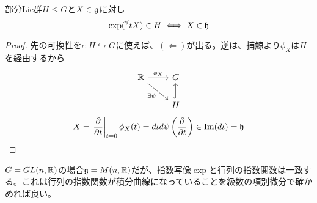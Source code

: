 \begin{prop}
    部分Lie群$H\leq G$と$X\in\mathfrak{g}$に対し
    \[\exp({}^\forall tX)\in H\iff X\in\mathfrak{h}\]
\end{prop}
\begin{proof}
    先の可換性を$\iota:H\hookrightarrow G$に使えば、$(\Leftarrow)$が出る。逆は、捕鯨より$\phi_X$は$H$を経由するから
    \[\begin{tikzcd}
        \R\arrow[r,"\phi_X"]\arrow[rd,"\exists\psi"'] & G\\
        & H\arrow[u,hook]
    \end{tikzcd}\]
    \[X=\left.\frac{\partial }{\partial t}\right\lvert_{t=0}\phi_X(t)=d\iota d\psi\left(\frac{\partial }{\partial t}\right)\in \mathrm{Im} (d\iota)=\mathfrak{h}\]
\end{proof}
\begin{eg}[$GL(n,\R)$の場合]
    $G=GL(n,\mathbb{R})$の場合$\mathfrak{g}=M(n,\mathbb{R})$だが、指数写像$\exp$と行列の指数関数は一致する。これは行列の指数関数が積分曲線になっていることを級数の項別微分で確かめれば良い。
\end{eg}


\ \\
